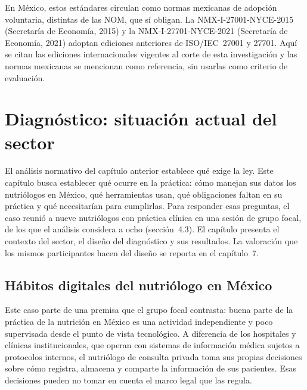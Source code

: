 \documentclass[12pt, a4paper]{article}
\makeatletter
\newcommand{\saltoseccion}{\par
  \ifx\@deferlist\@empty
    \ifdim\pagegoal<\maxdimen
      \ifdim\dimexpr\textheight-\pagegoal+\pagetotal\relax>0.5\textheight\clearpage\fi
    \fi
  \else\clearpage\fi}
\let\seccionbase\section
\renewcommand{\section}{\saltoseccion\seccionbase}
\makeatother
\begin{document}
En México, estos estándares circulan como normas mexicanas de
adopción voluntaria, distintas de las NOM, que sí obligan. La
NMX-I-27001-NYCE-2015 (Secretaría de Economía, 2015) y la
NMX-I-27701-NYCE-2021 (Secretaría de Economía, 2021) adoptan
ediciones anteriores de ISO/IEC~27001 y 27701. Aquí se citan las
ediciones internacionales vigentes al corte de esta investigación
y las normas mexicanas se mencionan como referencia, sin usarlas
como criterio de evaluación.
\section{Diagnóstico: situación actual del sector}
El análisis normativo del capítulo anterior establece qué exige la ley.
Este capítulo busca establecer qué ocurre en la práctica: cómo manejan
sus datos los nutriólogos en México, qué herramientas usan, qué
obligaciones faltan en su práctica y qué necesitarían para cumplirlas.
Para responder esas preguntas, el caso reunió a nueve nutriólogos con
práctica clínica en una sesión de grupo focal, de los que el análisis
considera a ocho (sección~4.3). El capítulo presenta el contexto del
sector, el diseño del diagnóstico y sus resultados. La valoración que
los mismos participantes hacen del diseño se reporta en el capítulo~7.

\subsection{Hábitos digitales del nutriólogo en México}

Este caso parte de una premisa que el grupo focal contrasta: buena parte
de la práctica de la nutrición en México es una actividad independiente
y poco supervisada desde el punto de vista
tecnológico. A diferencia de los hospitales y clínicas institucionales,
que operan con sistemas de información médica sujetos a protocolos
internos, el nutriólogo de consulta privada toma sus propias
decisiones sobre cómo registra, almacena y comparte la información
de sus pacientes. Esas decisiones pueden no tomar en cuenta el
marco legal que las regula.
\end{document}
